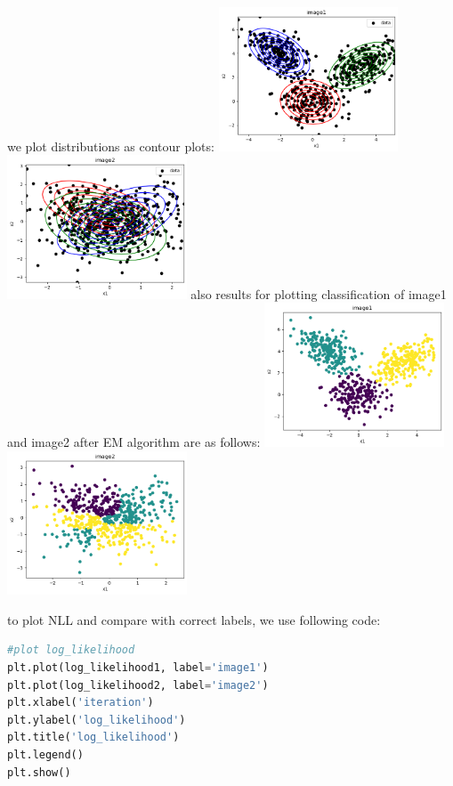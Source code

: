 \documentclass[12pt]{article}
\begin{document}
\begin{qsolve}
    we plot distributions as contour plots:
    \tcblower
    \centering
    \includegraphics[width=0.4\textwidth]{outputs/output9.png}
    \label{fig:fig9}
    \includegraphics[width=0.4\textwidth]{outputs/output10.png}
    \label{fig:fig10}
    \splitqsolve
    also results for plotting classification of image1 and image2 after EM algorithm are as follows:
    \tcblower
    \centering
    \includegraphics[width=0.4\textwidth]{outputs/output11.png}
    \label{fig:fig11}
    \includegraphics[width=0.4\textwidth]{outputs/output12.png}
    \label{fig:fig12}


    \splitqsolve
    to plot NLL and compare with correct labels, we use following code:
    \begin{lstlisting}[language=Python,caption={plot NLL},label={code:plot NLL}]
#plot log_likelihood
plt.plot(log_likelihood1, label='image1')
plt.plot(log_likelihood2, label='image2')
plt.xlabel('iteration')
plt.ylabel('log_likelihood')
plt.title('log_likelihood')
plt.legend()
plt.show()


\end{lstlisting}
\end{qsolve}
\end{document}
